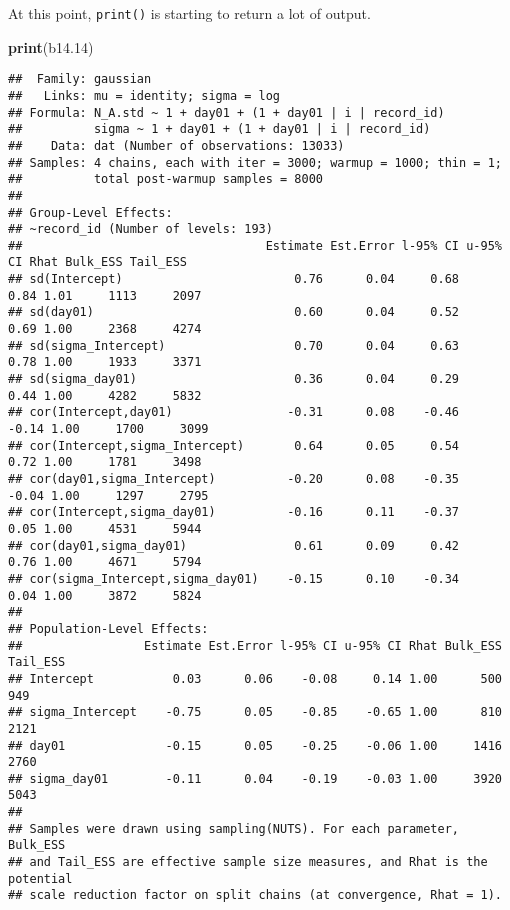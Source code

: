 \documentclass[]{article}
\newenvironment{Shaded}{\begin{snugshade}}{\end{snugshade}}
\newcommand{\FloatTok}[1]{\textcolor[rgb]{0.00,0.00,0.81}{#1}}
\newcommand{\KeywordTok}[1]{\textcolor[rgb]{0.13,0.29,0.53}{\textbf{#1}}}
\newcommand{\NormalTok}[1]{#1}
\begin{document}
At this point, \texttt{print()} is starting to return a lot of output.

\begin{Shaded}
\begin{Highlighting}[]
\KeywordTok{print}\NormalTok{(b14}\FloatTok{.14}\NormalTok{)}
\end{Highlighting}
\end{Shaded}

\begin{verbatim}
##  Family: gaussian 
##   Links: mu = identity; sigma = log 
## Formula: N_A.std ~ 1 + day01 + (1 + day01 | i | record_id) 
##          sigma ~ 1 + day01 + (1 + day01 | i | record_id)
##    Data: dat (Number of observations: 13033) 
## Samples: 4 chains, each with iter = 3000; warmup = 1000; thin = 1;
##          total post-warmup samples = 8000
## 
## Group-Level Effects: 
## ~record_id (Number of levels: 193) 
##                                  Estimate Est.Error l-95% CI u-95% CI Rhat Bulk_ESS Tail_ESS
## sd(Intercept)                        0.76      0.04     0.68     0.84 1.01     1113     2097
## sd(day01)                            0.60      0.04     0.52     0.69 1.00     2368     4274
## sd(sigma_Intercept)                  0.70      0.04     0.63     0.78 1.00     1933     3371
## sd(sigma_day01)                      0.36      0.04     0.29     0.44 1.00     4282     5832
## cor(Intercept,day01)                -0.31      0.08    -0.46    -0.14 1.00     1700     3099
## cor(Intercept,sigma_Intercept)       0.64      0.05     0.54     0.72 1.00     1781     3498
## cor(day01,sigma_Intercept)          -0.20      0.08    -0.35    -0.04 1.00     1297     2795
## cor(Intercept,sigma_day01)          -0.16      0.11    -0.37     0.05 1.00     4531     5944
## cor(day01,sigma_day01)               0.61      0.09     0.42     0.76 1.00     4671     5794
## cor(sigma_Intercept,sigma_day01)    -0.15      0.10    -0.34     0.04 1.00     3872     5824
## 
## Population-Level Effects: 
##                 Estimate Est.Error l-95% CI u-95% CI Rhat Bulk_ESS Tail_ESS
## Intercept           0.03      0.06    -0.08     0.14 1.00      500      949
## sigma_Intercept    -0.75      0.05    -0.85    -0.65 1.00      810     2121
## day01              -0.15      0.05    -0.25    -0.06 1.00     1416     2760
## sigma_day01        -0.11      0.04    -0.19    -0.03 1.00     3920     5043
## 
## Samples were drawn using sampling(NUTS). For each parameter, Bulk_ESS
## and Tail_ESS are effective sample size measures, and Rhat is the potential
## scale reduction factor on split chains (at convergence, Rhat = 1).
\end{verbatim}
\end{document}
